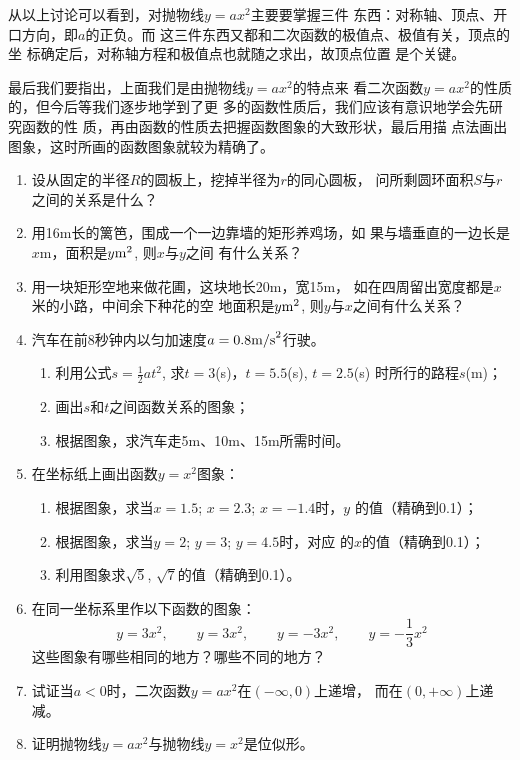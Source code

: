 从以上讨论可以看到，对抛物线$y=ax^2$主要要掌握三件
东西：对称轴、顶点、开口方向，即$a$的正负。而
这三件东西又都和二次函数的极值点、极值有关，顶点的坐
标确定后，对称轴方程和极值点也就随之求出，故顶点位置
是个关键。

最后我们要指出，上面我们是由抛物线$y=ax^2$的特点来
看二次函数$y=ax^2$的性质的，但今后等我们逐步地学到了更
多的函数性质后，我们应该有意识地学会先研究函数的性
质，再由函数的性质去把握函数图象的大致形状，最后用描
点法画出图象，这时所画的函数图象就较为精确了。


\begin{ex}
\begin{enumerate}
    \item 设从固定的半径$R$的圆板上，挖掉半径为$r$的同心圆板，
    问所剩圆环面积$S$与$r$之间的关系是什么？
    \item 用16m长的篱笆，围成一个一边靠墙的矩形养鸡场，如
    果与墙垂直的一边长是$x$m，面积是$y{\rm m}^2$, 则$x$与$y$之间
    有什么关系？
    \item     用一块矩形空地来做花圃，这块地长20m，宽15m，
    如在四周留出宽度都是$x$米的小路，中间余下种花的空
地面积是$y{\rm m}^2$, 则$y$与$x$之间有什么关系？
\item  汽车在前8秒钟内以匀加速度$a=0.8{\rm m/s}^2$行驶。
\begin{enumerate}
\item 利用公式$s=\frac{1}{2}at^2$, 求$t=3$(s)，$t=5.5$(s), $t=2.5$(s) 时所行的路程$s$(m)；
\item 画出$s$和$t$之间函数关系的图象；
\item 根据图象，求汽车走5m、10m、15m所需时间。
\end{enumerate}

\item  
在坐标纸上画出函数$y=x^2$图象：
\begin{enumerate}
\item 根据图象，求当$x=1.5$; $x=2.3$; $x=-1.4$时，$y$
的值（精确到0.1）；
\item 根据图象，求当$y=2$; $y=3$; $y=4.5$时，对应
的$x$的值（精确到0.1）；
\item 利用图象求$\sqrt{5}$, $\sqrt{7}$的值（精确到0.1）。
\end{enumerate}

\item   在同一坐标系里作以下函数的图象：
$$y=3x^2,\qquad y=3x^2,\qquad y=-3x^2,\qquad y=-\frac{1}{3}x^2$$
这些图象有哪些相同的地方？哪些不同的地方？
\item  试证当$a<0$时，二次函数$y=ax^2$在$(-\infty,0)$上递增，
而在$(0,+\infty)$上递减。
\item   证明抛物线$y=ax^2$与抛物线$y=x^2$是位似形。
\end{enumerate}
\end{ex}

